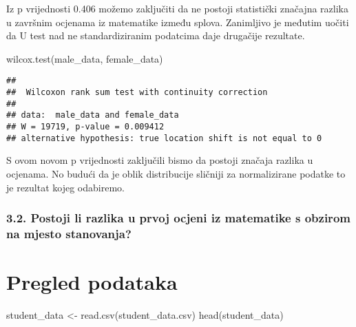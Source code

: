 \documentclass[
]{article}
\newenvironment{Shaded}{\begin{snugshade}}{\end{snugshade}}
\newcommand{\FunctionTok}[1]{\textcolor[rgb]{0.00,0.00,0.00}{#1}}
\newcommand{\NormalTok}[1]{#1}
\newcommand{\OtherTok}[1]{\textcolor[rgb]{0.56,0.35,0.01}{#1}}
\newcommand{\StringTok}[1]{\textcolor[rgb]{0.31,0.60,0.02}{#1}}
\begin{document}
Iz p vrijednosti 0.406 možemo zaključiti da ne postoji statistički
značajna razlika u završnim ocjenama iz matematike između splova.
Zanimljivo je međutim uočiti da U test nad ne standardiziranim podatcima
daje drugačije rezultate.

\begin{Shaded}
\begin{Highlighting}[]
\FunctionTok{wilcox.test}\NormalTok{(male\_data, female\_data)}
\end{Highlighting}
\end{Shaded}

\begin{verbatim}
## 
##  Wilcoxon rank sum test with continuity correction
## 
## data:  male_data and female_data
## W = 19719, p-value = 0.009412
## alternative hypothesis: true location shift is not equal to 0
\end{verbatim}

S ovom novom p vrijednosti zaključili bismo da postoji značaja razlika u
ocjenama. No budući da je oblik distribucije sličniji za normalizirane
podatke to je rezultat kojeg odabiremo.

\hypertarget{postoji-li-razlika-u-prvoj-ocjeni-iz-matematike-s-obzirom-na-mjesto-stanovanja}{%
\subsubsection{3.2. Postoji li razlika u prvoj ocjeni iz matematike s
obzirom na mjesto
stanovanja?}\label{postoji-li-razlika-u-prvoj-ocjeni-iz-matematike-s-obzirom-na-mjesto-stanovanja}}

\hypertarget{pregled-podataka}{%
\section{Pregled podataka}\label{pregled-podataka}}

\begin{Shaded}
\begin{Highlighting}[]
\NormalTok{student\_data }\OtherTok{\textless{}{-}} \FunctionTok{read.csv}\NormalTok{(}\StringTok{\textquotesingle{}student\_data.csv\textquotesingle{}}\NormalTok{)}
\FunctionTok{head}\NormalTok{(student\_data)}
\end{Highlighting}
\end{Shaded}
\end{document}
